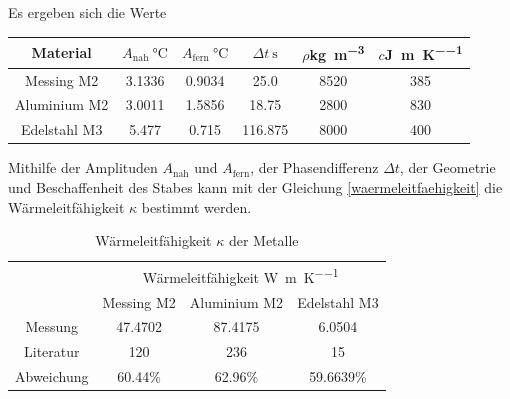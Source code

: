 \newpage
\noindent Es ergeben sich die Werte
\begin{table}[htbp]
	\centering
	\begin{tabular}{c S[table-format=1.5] S[table-format=1.5] S[table-format=3.3] c c}
		\toprule
		{Material}&{$A_\text{nah} \:\si{\degreeCelsius}$}&{$A_\text{fern}\:\si{\degreeCelsius}$}&{$\Delta{t}\:\si{\second}$}&{$\rho$\:\si{\kilo\gram\per\meter\cubed}}&{$c$\:\si{\joule\per\meter\per\kelvin}}\\
		\midrule
		{Messing M2}& 	{3.1336}&{0.9034}&	{25.0}&		{8520}&{385}\\
		{Aluminium M2}&	{3.0011}&{1.5856}&	{18.75}&	{2800}&{830}\\
		{Edelstahl M3}&	{5.477}&{0.715}&	{116.875}&	{8000}&{400}\\
		\bottomrule
	\end{tabular}
\end{table}
Mithilfe der Amplituden $A_{\text{nah}}$ und $A_{\text{fern}}$, der Phasendifferenz $\Delta t$, der Geometrie und Beschaffenheit des Stabes kann mit der Gleichung \eqref{waermeleitfaehigkeit} die Wärmeleitfähigkeit $\kappa$ bestimmt werden.
\begin{table}[htbp]
	\centering
	\begin{tabular}{cccc}
	\toprule
	&\multicolumn{3}{c}{Wärmeleitfähigkeit \kappa \:\si{\watt\per\meter\per\kelvin}}\\
	&{Messing M2}&{Aluminium M2}&{Edelstahl M3}\\
	\midrule
	{Messung}&{47.4702}& 87.4175&6.0504\\
	{Literatur}&{120}&{236}&15\\
	\midrule
	{Abweichung}&60.44\%&62.96\%&59.6639\%\\
	\bottomrule
	\end{tabular}
	\label{tab:waermeleitfaehigkeitwerte}
	\caption{Wärmeleitfähigkeit $\kappa$ der Metalle}
\end{table}
